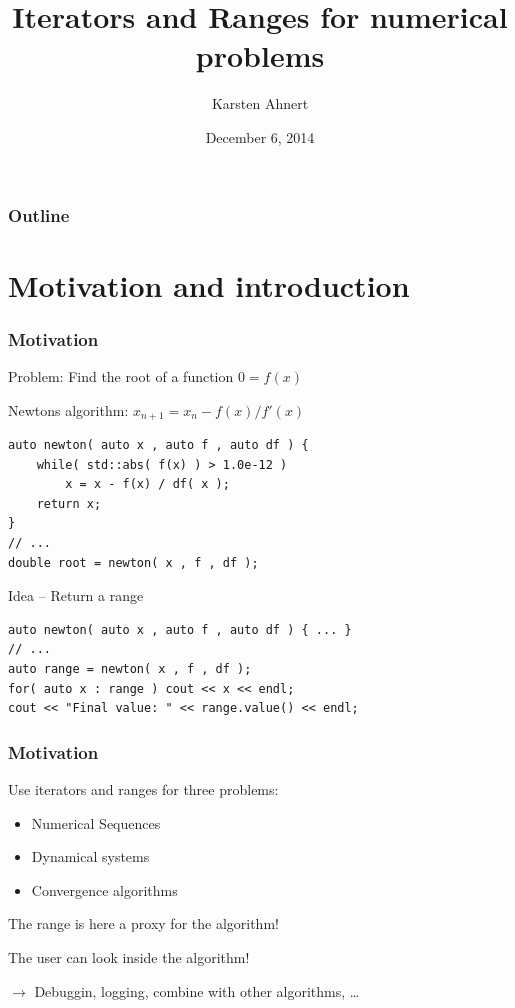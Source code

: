 \documentclass{beamer}
\title[Iteratorst]{Iterators and Ranges for numerical problems}
\author[Karsten Ahnert]{Karsten Ahnert}
\institute[Ambrosys]{Ambrosys GmbH, Potsdam}
\date{December 6, 2014}
\newcommand{\heading}[1]{\frametitle{#1}}
\begin{document}
\frame{
  \titlepage


}



\begin{frame}
  \heading{Outline}

  \tableofcontents
\end{frame}



\section{Motivation and introduction}




\begin{frame}[fragile]
\heading{Motivation}

Problem: Find the root of a function \hspace{2ex} $0=f(x)$

\vspace{0.5ex}
Newtons algorithm: \hspace{2ex} $x_{n+1} = x_n - f(x)/f'(x)$
\vspace{2ex}
  \begin{lstlisting}[basicstyle=\scriptsize\ttfamily]
auto newton( auto x , auto f , auto df ) {
    while( std::abs( f(x) ) > 1.0e-12 )
        x = x - f(x) / df( x );
    return x;
}
// ...
double root = newton( x , f , df );
  \end{lstlisting}
\vspace{2ex}

\pause
Idea -- Return a range
\begin{lstlisting}[basicstyle=\scriptsize\ttfamily]
auto newton( auto x , auto f , auto df ) { ... }
// ...
auto range = newton( x , f , df );
for( auto x : range ) cout << x << endl;
cout << "Final value: " << range.value() << endl;
\end{lstlisting}

\end{frame}



\begin{frame}[fragile]
 \heading{Motivation}
 
 Use iterators and ranges for three problems:
 
 \begin{itemize}
  \item Numerical Sequences
  \item Dynamical systems
  \item Convergence algorithms
 \end{itemize}
 
 \vspace{2ex}
 
 The range is here a proxy for the algorithm!
 
 \vspace{2ex}
 The user can look inside the algorithm!
 
 $\longrightarrow$ Debuggin, logging, combine with other algorithms, \dots

\end{frame}
\end{document}
